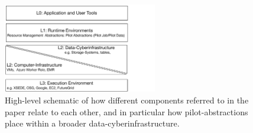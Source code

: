 \documentclass[times]{cpeauth}
\newcommand{\jhanote}[1]{ {\textcolor{red} { ***shantenu: #1 }}}
\newcommand{\pmnote}[1]{ {\textcolor{blue} { ***Pradeep: #1 }}}
\newcommand{\note}[1]{ {\textcolor{magenta} { ***Note: #1 }}}
\newcommand{\pmnote}[1]{}
\newcommand{\jhanote}[1]{}
\newcommand{\note}[1]{}
\begin{document}





\begin{figure}[t] \centering
\includegraphics[width=0.6\textwidth]{figures/data-intensive-arch.pdf}
\caption{High-level schematic of how different components referred to
  in the paper relate to each other, and in particular how
  pilot-abstractions place within a broader data-cyberinfrastructure.}
\label{fig:figures_arch}
\end{figure}
\end{document}
